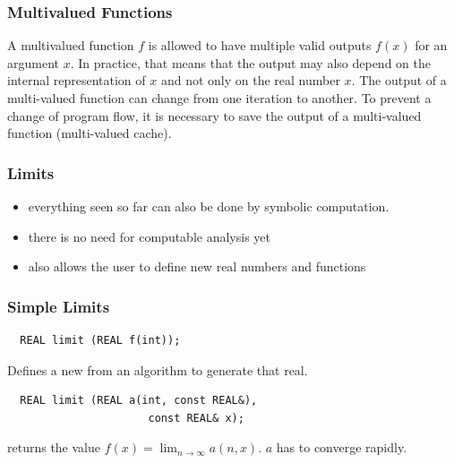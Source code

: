 \begin{frame}
  \frametitle{Multivalued Functions}
  \large
  A multivalued function $f$ is allowed to have multiple valid outputs $f(x)$ for an argument $x$.
  \pause
  \vfill
  In practice, that means that the output may also depend on the internal representation of $x$
  and not only on the real number $x$.
  \pause
  \vfill
  The output of a multi-valued function can change from one iteration to another.
  To prevent a change of program flow, it is necessary to save the output of a multi-valued function (multi-valued cache).
\end{frame}
\begin{frame}
  \frametitle{Limits}
  \begin{itemize}[<+->]
    \item everything seen so far can also be done by symbolic computation.
    \item there is no need for computable analysis yet
    \item \irram also allows the user to define new real numbers and functions
  \end{itemize}
\end{frame}
\begin{frame}[<+->][fragile]
  \frametitle{Simple Limits}
  \begin{lstlisting}
  REAL limit (REAL f(int));
  \end{lstlisting}
  Defines a new \real from an algorithm to generate that real.
  \vfill
  \pause
  \begin{lstlisting}
  REAL limit (REAL a(int, const REAL&),
                      const REAL& x);
  \end{lstlisting}
  returns the value $f(x) = \lim_{n \to \infty} a(n,x)$.
  $a$ has to converge rapidly.
\end{frame}
